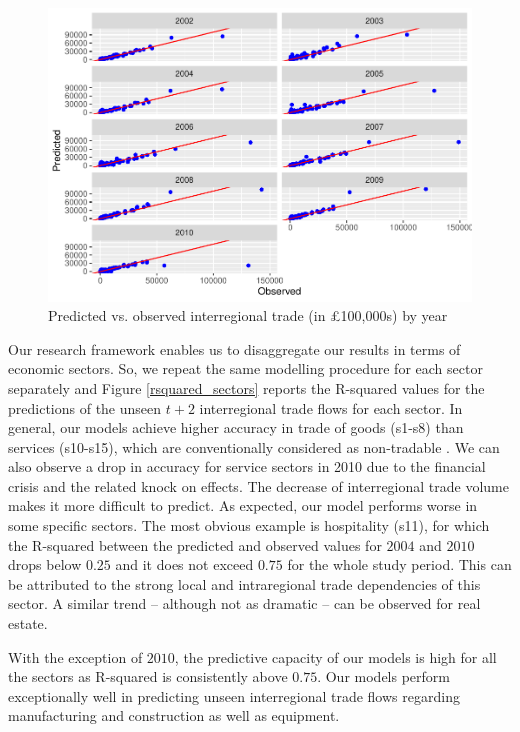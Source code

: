\documentclass[]{interact}
\theoremstyle{plain}%
\theoremstyle{definition}
\theoremstyle{remark}
\begin{document}
\begin{figure}[p]
\includegraphics[width=1\linewidth]{hl_v2_files/figure-latex/unnamed-chunk-7-1} \caption{\label{prediction}Predicted vs. observed interregional trade (in £100,000s) by year}\label{fig:unnamed-chunk-7}
\end{figure}

Our research framework enables us to disaggregate our results in terms
of economic sectors. So, we repeat the same modelling procedure for each
sector separately and Figure \ref{rsquared_sectors} reports the
R-squared values for the predictions of the unseen \(t + 2\)
interregional trade flows for each sector. In general, our models
achieve higher accuracy in trade of goods (s1-s8) than services
(s10-s15), which are conventionally considered as non-tradable
\citep{jensen2005}. We can also observe a drop in accuracy for service
sectors in 2010 due to the financial crisis and the related knock on
effects. The decrease of interregional trade volume makes it more
difficult to predict. As expected, our model performs worse in some
specific sectors. The most obvious example is hospitality (s11), for
which the R-squared between the predicted and observed values for
\(2004\) and \(2010\) drops below \(0.25\) and it does not exceed
\(0.75\) for the whole study period. This can be attributed to the
strong local and intraregional trade dependencies of this sector. A
similar trend -- although not as dramatic -- can be observed for real
estate.

With the exception of \(2010\), the predictive capacity of our models is
high for all the sectors as R-squared is consistently above \(0.75\).
Our models perform exceptionally well in predicting unseen interregional
trade flows regarding manufacturing and construction as well as
equipment.
\end{document}

